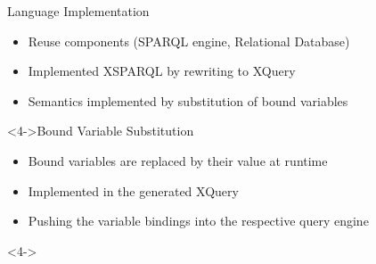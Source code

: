 \begin{frame}{Language Implementation}

  \begin{block}{}
    \begin{itemize}
    \item<1-> Reuse components (SPARQL engine, Relational Database)
    \item<2-> Implemented XSPARQL by rewriting to XQuery
    \item<3-> Semantics implemented by substitution of bound variables
    \end{itemize}
  \end{block}

  \begin{block}<4->{Bound Variable Substitution}
    \begin{itemize}
    \item<4-> \alert{Bound} variables are replaced by their \alert{value} at runtime
    \item<5-> Implemented in the generated XQuery
    \item<6-> Pushing the variable bindings into the respective query engine
    \end{itemize}
  \end{block}

  \begin{block}<4->{}
  \end{block}


\end{frame}


